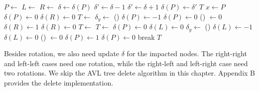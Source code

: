 \documentclass[b5paper]{article}
\begin{document}
\begin{algorithmic}[1]
    \State $P \gets $ 
    \State $L \gets $ 
    \State $R \gets $ 
    \State $\delta \gets \delta(P)$
      \State $\delta' \gets \delta - 1$
    \Else
      \State $\delta' \gets \delta + 1$
    \EndIf
    \State $\delta(P) \gets \delta'$
     
      \State \Return $T$
     
      \State $x \gets P$
         
          \State $\delta(P) \gets 0$ 
          \State $\delta(R) \gets 0$
          \State $T \gets $ 
        \EndIf
         
          \State $\delta_y \gets $ \textproc{$\delta$}() 
            \State $\delta(P) \gets -1$
          \Else
            \State $\delta(P) \gets 0$
          \EndIf
          \State \textproc{$\delta$}() $\gets 0$
            \State $\delta(R) \gets 1$
          \Else
            \State $\delta(R) \gets 0$
          \EndIf
          \State $T \gets $ 
          \State $T \gets $ 
        \EndIf
      \EndIf
         
          \State $\delta(P) \gets 0$
          \State $\delta(L) \gets 0$
          \State {}
        \Else {}
          \State $\delta_y \gets $ \textproc{$\delta$}()
            \State $\delta(L) \gets -1$
          \Else
            \State $\delta(L) \gets 0$
          \EndIf
          \State \textproc{$\delta$}() $\gets 0$
            \State $\delta(P) \gets 1$
          \Else
            \State $\delta(P) \gets 0$
          \EndIf
          \State {}
          \State {}
        \EndIf
      \EndIf
      \State break
    \EndIf
  \EndWhile
  \State \Return $T$
\EndFunction
\end{algorithmic}

Besides rotation, we also need update $\delta$ for the impacted nodes. The right-right and left-left cases need one rotation, while the right-left and left-right case need two rotations. We skip the AVL tree delete algorithm in this chapter. Appendix B provides the delete implementation.
\end{document}

